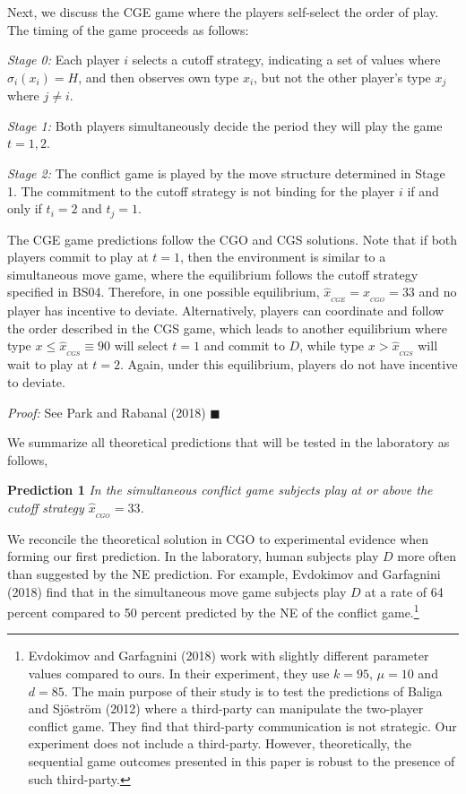 \documentclass[12pt,english]{article}
\begin{document}
Next, we discuss the CGE game where the players self-select the order of play. The timing of the game proceeds as follows:

\textit{Stage 0:} Each player $i$ selects a cutoff strategy, indicating a set of values where $\sigma_i(x_i)=H$, and then observes own type $x_i$, but not the other player's type $x_j$ where $j\neq i$.

 \textit{Stage 1:} Both players simultaneously decide the period they will play the game $t=1,2$. 

\textit{Stage 2:} The conflict game is played by the move structure determined in Stage 1. The commitment to the cutoff strategy is not binding for the player $i$ if and only if $t_i=2$ and $t_j=1$. 

The CGE game predictions follow the CGO and CGS solutions. Note that if both players commit to play at $t=1$, then the environment is similar to a simultaneous move game, where the equilibrium follows the cutoff strategy specified in BS04. Therefore, in one possible equilibrium, $\hat{x}_{_{CGE}}=\hat{x}_{_{CGO}}=33$ and
no player has incentive to deviate. Alternatively, players can coordinate and follow the order described in the CGS game, which leads to another equilibrium where type $x\leq \hat{x}_{_{CGS}}\equiv 90$ will select $t=1$ and commit to $D$, while type $x>\hat{x}_{_{CGS}}$ will wait to play at $t=2$. Again, under this equilibrium, players do not have incentive to deviate. 

\noindent \textit{Proof:} See Park and Rabanal (2018) $\blacksquare$

We summarize all theoretical predictions that will be tested in the laboratory as follows,

\noindent \textbf{Prediction 1}
\textit{In the simultaneous conflict game  subjects play at or above the cutoff strategy $\hat{x}_{_{CGO}}=33$.}

We reconcile the theoretical solution in CGO to experimental evidence when forming our first prediction. In the laboratory, human subjects play $D$ more often than suggested by the NE prediction. For example, Evdokimov and Garfagnini (2018) find that in the simultaneous move game subjects play $D$ at a rate of 64 percent compared to 50 percent predicted by the NE of the conflict game.\footnote{Evdokimov and Garfagnini (2018) work with slightly different parameter values compared to ours. In their experiment, they use $k=95$, $\mu=10$ and $d=85$. The main purpose of their study is to test the predictions of Baliga and Sj\"ostr\"om (2012) where a third-party can manipulate the two-player conflict game. They find that third-party communication is not strategic. Our experiment does not include a third-party. However, theoretically, the sequential game outcomes presented in this paper is robust to the presence of such third-party.} 
\end{document}
